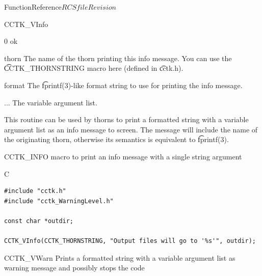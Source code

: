\begin{cactuspart}{FunctionReference}{$RCSfile$}{$Revision$}
\begin{FunctionDescription}{CCTK\_VInfo}
\begin{ResultSection}
\begin{Result}{0} ok \end{Result}
\end{ResultSection}

\begin{ParameterSection}
\begin{Parameter}{thorn}
The name of the thorn printing this info message. You can use the
{\t CCTK\_THORNSTRING} macro here (defined in {\t cctk.h}).
\end{Parameter}
\begin{Parameter}{format}
The {\t fprintf(3)}-like format string to use for printing the info message.
\end{Parameter}
\begin{Parameter}{...}
The variable argument list.
\end{Parameter}
\end{ParameterSection}

\begin{Discussion}
This routine can be used by thorns to print a formatted string with a variable
argument list as an info message to screen.
The message will include the name of the originating thorn, otherwise its
semantics is equivalent to {\t fprintf(3)}.
\end{Discussion}

\begin{SeeAlsoSection}
\begin{SeeAlso}{CCTK\_INFO}
macro to print an info message with a single string argument
\end{SeeAlso}
\end{SeeAlsoSection}

\begin{ExampleSection}
\begin{Example}{C}
\begin{verbatim}
#include "cctk.h"
#include "cctk_WarningLevel.h"

const char *outdir;

CCTK_VInfo(CCTK_THORNSTRING, "Output files will go to '%s'", outdir);
\end{verbatim}
\end{Example}
\end{ExampleSection}
\end{FunctionDescription}


\begin{FunctionDescription}{CCTK\_VWarn}
\label{CCTK-VWarn}
Prints a formatted string with a variable argument list as warning message and
possibly stops the code


\end{FunctionDescription}
\end{cactuspart}
